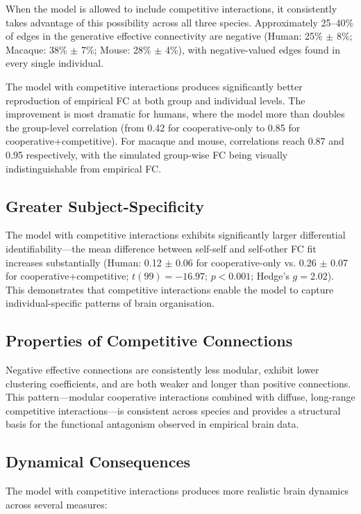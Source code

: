 \documentclass[11pt]{article}
\begin{document}
When the model is allowed to include competitive interactions, it consistently takes advantage of this possibility across all three species. Approximately 25--40\% of edges in the generative effective connectivity are negative (Human: 25\% $\pm$ 8\%; Macaque: 38\% $\pm$ 7\%; Mouse: 28\% $\pm$ 4\%), with negative-valued edges found in every single individual.

The model with competitive interactions produces significantly better reproduction of empirical FC at both group and individual levels. The improvement is most dramatic for humans, where the model more than doubles the group-level correlation (from 0.42 for cooperative-only to 0.85 for cooperative+competitive). For macaque and mouse, correlations reach 0.87 and 0.95 respectively, with the simulated group-wise FC being visually indistinguishable from empirical FC.

\subsection{Greater Subject-Specificity}

The model with competitive interactions exhibits significantly larger differential identifiability---the mean difference between self-self and self-other FC fit increases substantially (Human: 0.12 $\pm$ 0.06 for cooperative-only vs. 0.26 $\pm$ 0.07 for cooperative+competitive; $t(99) = -16.97$; $p < 0.001$; Hedge's $g = 2.02$). This demonstrates that competitive interactions enable the model to capture individual-specific patterns of brain organisation.

\subsection{Properties of Competitive Connections}

Negative effective connections are consistently less modular, exhibit lower clustering coefficients, and are both weaker and longer than positive connections. This pattern---modular cooperative interactions combined with diffuse, long-range competitive interactions---is consistent across species and provides a structural basis for the functional antagonism observed in empirical brain data.

\subsection{Dynamical Consequences}

The model with competitive interactions produces more realistic brain dynamics across several measures:
\end{document}
